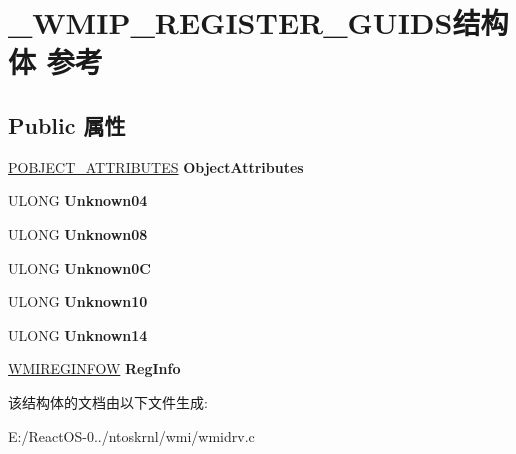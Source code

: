 \hypertarget{struct___w_m_i_p___r_e_g_i_s_t_e_r___g_u_i_d_s}{}\section{\+\_\+\+W\+M\+I\+P\+\_\+\+R\+E\+G\+I\+S\+T\+E\+R\+\_\+\+G\+U\+I\+D\+S结构体 参考}
\label{struct___w_m_i_p___r_e_g_i_s_t_e_r___g_u_i_d_s}
\subsection*{Public 属性}
\begin{DoxyCompactItemize}
\item 
\mbox{\label{struct___w_m_i_p___r_e_g_i_s_t_e_r___g_u_i_d_s_a9929322473a78ba6070f91497ebd4982}} 
\hyperlink{struct___o_b_j_e_c_t___a_t_t_r_i_b_u_t_e_s}{P\+O\+B\+J\+E\+C\+T\+\_\+\+A\+T\+T\+R\+I\+B\+U\+T\+ES} {\bfseries Object\+Attributes}
\item 
\mbox{\label{struct___w_m_i_p___r_e_g_i_s_t_e_r___g_u_i_d_s_a42532c5f3f69ca3cb349c919d99aa1fe}} 
U\+L\+O\+NG {\bfseries Unknown04}
\item 
\mbox{\label{struct___w_m_i_p___r_e_g_i_s_t_e_r___g_u_i_d_s_a64e3a7250c95627067f6af8328fd86d7}} 
U\+L\+O\+NG {\bfseries Unknown08}
\item 
\mbox{\label{struct___w_m_i_p___r_e_g_i_s_t_e_r___g_u_i_d_s_aa653adbf6f919c5832c413970c13c770}} 
U\+L\+O\+NG {\bfseries Unknown0C}
\item 
\mbox{\label{struct___w_m_i_p___r_e_g_i_s_t_e_r___g_u_i_d_s_a9518080a2d577f5af3008721bf7f4846}} 
U\+L\+O\+NG {\bfseries Unknown10}
\item 
\mbox{\label{struct___w_m_i_p___r_e_g_i_s_t_e_r___g_u_i_d_s_a8ab53ad7da3916bd828d9a17c121d4d8}} 
U\+L\+O\+NG {\bfseries Unknown14}
\item 
\mbox{\label{struct___w_m_i_p___r_e_g_i_s_t_e_r___g_u_i_d_s_a1c583299188e52d93162b900067dafcf}} 
\hyperlink{struct_w_m_i_r_e_g_i_n_f_o_w}{W\+M\+I\+R\+E\+G\+I\+N\+F\+OW} {\bfseries Reg\+Info}
\end{DoxyCompactItemize}


该结构体的文档由以下文件生成\+:\begin{DoxyCompactItemize}
\item 
E\+:/\+React\+O\+S-\/0../ntoskrnl/wmi/wmidrv.\+c\end{DoxyCompactItemize}
